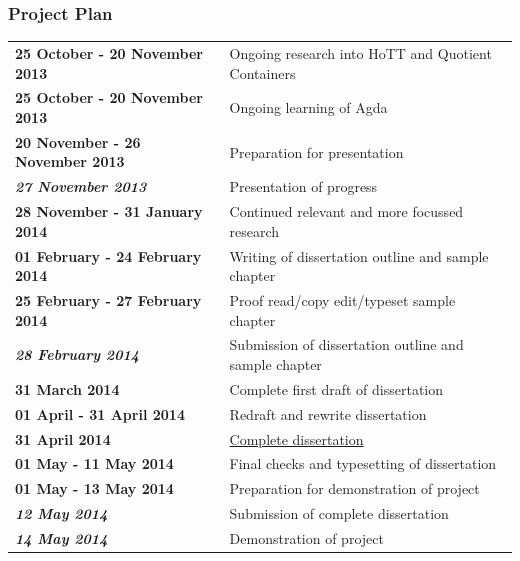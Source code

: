 \documentclass{beamer}
\begin{document}
\begin{frame}
\frametitle{Project Plan}
\fontsize{7.5pt}{7.2}\selectfont
\begin{center}
\begin{tabular}{l l}

 \textbf{25 October - 20 November 2013} & Ongoing research into HoTT and Quotient Containers \\
 \textbf{25 October - 20 November 2013} & Ongoing learning of Agda \\
 \textbf{20 November - 26 November 2013} & Preparation for presentation \\
 \textit{\textbf{27 November 2013}} & Presentation of progress \\
 \textbf{28 November - 31 January 2014} & Continued relevant and more focussed research  \\
 \textbf{01 February - 24 February 2014} & Writing of dissertation outline and sample chapter \\

 \textbf{25 February - 27 February 2014} & Proof read/copy edit/typeset sample chapter \\
 \textit{\textbf{28 February 2014}} & Submission of dissertation outline and sample chapter \\
 \textbf{31 March 2014} & Complete first draft of dissertation \\
 \textbf{01 April - 31 April 2014} & Redraft and rewrite dissertation \\
 \textbf{31 April 2014} & \underline{Complete dissertation} \\
 \textbf{01 May - 11 May 2014} & Final checks and typesetting of dissertation \\
 \textbf{01 May - 13 May 2014} & Preparation for demonstration of project \\
 \textit{\textbf{12 May 2014}} & Submission of complete dissertation \\
 \textit{\textbf{14 May 2014}} & Demonstration of project \\

\end{tabular}
\end{center}
\end{frame}

\end{document}
